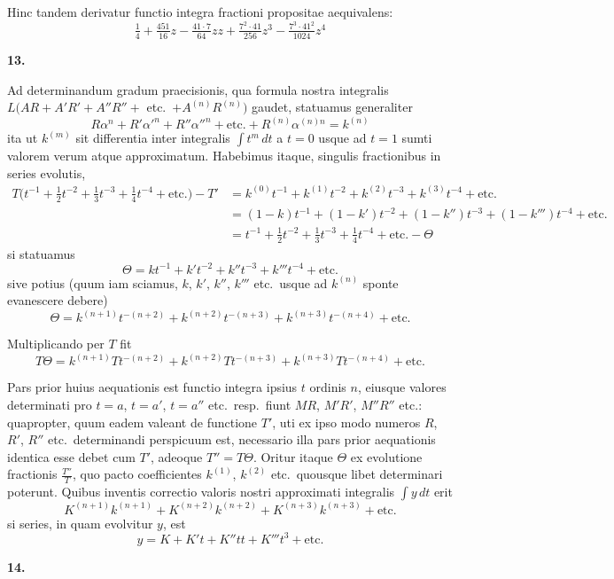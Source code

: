 \documentclass[12pt,a4paper]{article}
\newcommand{\art}[1]{\par\medskip\noindent\textbf{#1.}\par\nopagebreak\smallskip}
\begin{document}
Hinc tandem derivatur functio integra fractioni propositae aequivalens:
\[
\tfrac{1}{4} + \tfrac{451}{16}z - \tfrac{41\cdot7}{64}zz + \tfrac{7^2\cdot41}{256}z^3 - \tfrac{7^3\cdot41^2}{1024}z^4
\]

\art{13}

Ad determinandum gradum praecisionis, qua formula nostra integralis $L(AR+A'R'+A''R''+$ etc.\ $+A^{(n)}R^{(n)})$ gaudet, statuamus generaliter
\[
R\alpha^n + R'\alpha'^n + R''\alpha''^n + \text{etc.} + R^{(n)}\alpha^{(n)n} = k^{(n)}
\]
ita ut $k^{(m)}$ sit differentia inter integralis $\int\!t^m\,dt$ a $t=0$ usque ad $t=1$ sumti valorem verum atque approximatum. Habebimus itaque, singulis fractionibus in series evolutis,
\begin{align*}
T\bigl(t^{-1} + \tfrac{1}{2}t^{-2} + \tfrac{1}{3}t^{-3} + \tfrac{1}{4}t^{-4} + \text{etc.}\bigr) - T' &= k^{(0)}t^{-1} + k^{(1)}t^{-2} + k^{(2)}t^{-3} + k^{(3)}t^{-4} + \text{etc.}\\
&= (1-k)t^{-1} + (1-k')t^{-2} + (1-k'')t^{-3} + (1-k''')t^{-4} + \text{etc.}\\
&= t^{-1} + \tfrac{1}{2}t^{-2} + \tfrac{1}{3}t^{-3} + \tfrac{1}{4}t^{-4} + \text{etc.} - \Theta
\end{align*}
si statuamus
\[
\Theta = kt^{-1} + k't^{-2} + k''t^{-3} + k'''t^{-4} + \text{etc.}
\]
sive potius (quum iam sciamus, $k$, $k'$, $k''$, $k'''$ etc.\ usque ad $k^{(n)}$ sponte evanescere debere)
\[
\Theta = k^{(n+1)}t^{-(n+2)} + k^{(n+2)}t^{-(n+3)} + k^{(n+3)}t^{-(n+4)} + \text{etc.}
\]

Multiplicando per $T$ fit
\[
T\Theta = k^{(n+1)}Tt^{-(n+2)} + k^{(n+2)}Tt^{-(n+3)} + k^{(n+3)}Tt^{-(n+4)} + \text{etc.}
\]

Pars prior huius aequationis est functio integra ipsius $t$ ordinis $n$, eiusque valores determinati pro $t=a$, $t=a'$, $t=a''$ etc.\ resp.\ fiunt $MR$, $M'R'$, $M''R''$ etc.: quapropter, quum eadem valeant de functione $T'$, uti ex ipso modo numeros $R$, $R'$, $R''$ etc.\ determinandi perspicuum est, necessario illa pars prior aequationis identica esse debet cum $T'$, adeoque $T''=T\Theta$. Oritur itaque $\Theta$ ex evolutione fractionis $\frac{T''}{T}$, quo pacto coefficientes $k^{(1)}$, $k^{(2)}$ etc.\ quousque libet determinari poterunt. Quibus inventis correctio valoris nostri approximati integralis $\int\!y\,dt$ erit
\[
K^{(n+1)}k^{(n+1)} + K^{(n+2)}k^{(n+2)} + K^{(n+3)}k^{(n+3)} + \text{etc.}
\]
si series, in quam evolvitur $y$, est
\[
y = K + K't + K''tt + K'''t^3 + \text{etc.}
\]

\art{14}
\end{document}

